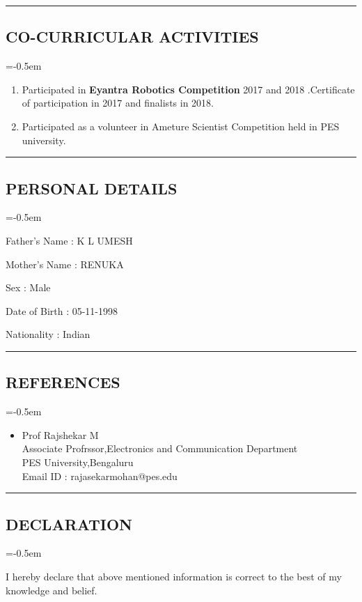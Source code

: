 \documentclass[10pt,letterpaper]{article}
\begin{document}
\hrule
\subsection*{CO-CURRICULAR ACTIVITIES}
\parskip=-0.5em

\begin{enumerate}

	\item Participated in \textbf{Eyantra Robotics Competition } 2017 and 2018 .Certificate of participation in 2017 and finalists in 2018.
	\item Participated as a volunteer in Ameture Scientist Competition held in PES university.

\end{enumerate}

\pagebreak
\hrule
\subsection*{PERSONAL DETAILS}
\parskip=-0.5em

\begin{description}

\item Father's Name : K L UMESH 
\item Mother's Name : RENUKA 
\item Sex : Male 
\item Date of Birth : 05-11-1998
\item Nationality : Indian

\end{description}

\hrule
\subsection*{REFERENCES}
\parskip=-0.5em

\begin{itemize} 

\item Prof Rajshekar M\\Associate Profrssor,Electronics and Communication Department\\PES University,Bengaluru\\Email ID : rajasekarmohan@pes.edu\\

\end{itemize}

\hrule
\subsection*{DECLARATION}
\parskip=-0.5em

\begin{description}

\item I hereby declare that above mentioned information is correct to the best of my knowledge and belief.

\end{description}
\end{document}
